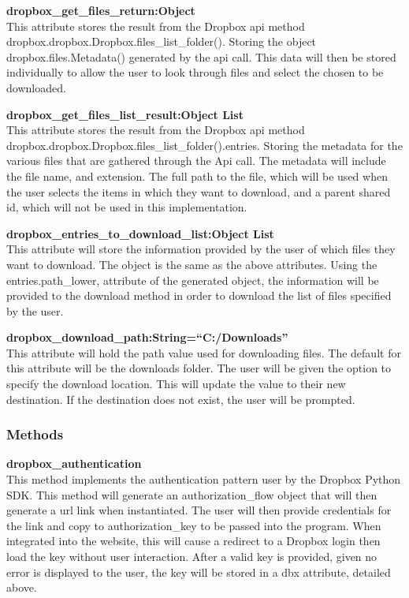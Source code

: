 \textbf{dropbox\_get\_files\_return:Object} \\
    This attribute stores the result from the Dropbox api method dropbox.dropbox.Dropbox.files\_list\_folder(). Storing the object 
    dropbox.files.Metadata() generated by the api call. This data will then be stored individually to allow the user to look through 
    files and select the chosen to be downloaded.

\textbf{dropbox\_get\_files\_list\_result:Object List} \\
    This attribute stores the result from the Dropbox api method dropbox.dropbox.Dropbox.files\_list\_folder().entries. Storing the metadata for 
    the various files that are gathered through the Api call. The metadata will include the file name, and extension. The full path to the file, 
    which will be used when the user selects the items in which they want to download, and a parent shared id, which will not be used in this 
    implementation.

\textbf{dropbox\_entries\_to\_download\_list:Object List} \\
    This attribute will store the information provided by the user of which files they want to download. The object is the same as the above 
    attributes. Using the entries.path\_lower, attribute of the generated object, the information will be provided to the download method in 
    order to download the list of files specified by the user.

\textbf{dropbox\_download\_path:String=``C:/Downloads''} \\
    This attribute will hold the path value used for downloading files. The default for this attribute will be the downloads folder. The user 
    will be given the option to specify the download location. This will update the value to their new destination. If the destination does 
    not exist, the user will be prompted.

\subsubsection{Methods}
\textbf{dropbox\_authentication} \\
    This method implements the authentication pattern user by the Dropbox Python SDK. This method will generate an authorization\_flow object
    that will then generate a url link when instantiated. The user will then provide credentials for the link and copy to authorization\_key 
    to be passed into the program. When integrated into the website, this will cause a redirect to a Dropbox login then load the key without 
    user interaction. After a valid key is provided, given no error is displayed to the user, the key will be stored in a dbx attribute, detailed 
    above.  

